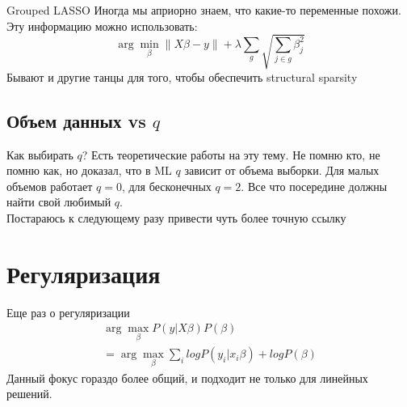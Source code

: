 \documentclass[14pt, fleqn, xcolor={dvipsnames, table}]{beamer}
\begin{document}
\begin{frame}{Grouped LASSO}
Иногда мы априорно знаем, что какие-то переменные похожи. Эту информацию можно использовать:
  $$
    \arg \min_\beta \|X\beta - y\| + \lambda \sum_{g} \sqrt{\sum_{j \in g} \beta_j^2}
  $$
Бывают и другие танцы для того, чтобы обеспечить structural sparsity
\end{frame}

\subsection{Объем данных vs $q$}
\begin{frame}{Как выбирать $q$?}
Есть теоретические работы на эту тему. Не помню кто, не помню как, но доказал, что в ML $q$ зависит от объема выборки. Для малых объемов работает $q = 0$, для бесконечных $q=2$. Все что посередине должны найти свой любимый $q$. \\

\footnotesize
Постараюсь к следующему разу привести чуть более точную ссылку
\end{frame}

\section{Регуляризация}
\begin{frame}{Еще раз о регуляризации}
$$\begin{array}{l}
\arg \max_\beta P(y|X\beta) P(\beta) \\
= \arg \max_\beta \sum_i log P(y_i|x_i\beta) + log P(\beta)
\end{array}$$
Данный фокус гораздо более общий, и подходит не только для линейных решений.
\end{frame}
\end{document}
